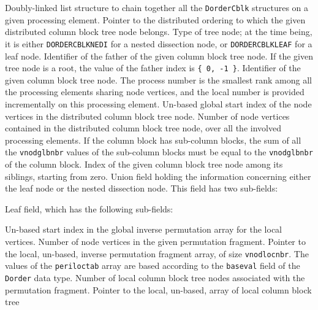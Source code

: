\begin{itemize}
  Doubly-linked list structure to chain together all
  the \texttt{Dorder\lbt Cblk} structures on a given processing
  element.
  Pointer to the distributed ordering to which the given distributed
  column block tree node belongs.
  Type of tree node; at the time being, it is either
  \texttt{DORDER\lbt CBLK\lbt NEDI} for a nested dissection node, or
  \texttt{DORDER\lbt CBLK\lbt LEAF} for a leaf node.
  Identifier of the father of the given column block tree node. If the
  given tree node is a root, the value of the father index is
  \texttt{\{~0, -1~\}}.
  Identifier of the given column block tree node. The process number
  is the smallest rank among all the processing elements sharing node
  vertices, and the local number is provided incrementally on this
  processing element.
  Un-based global start index of the node vertices in the distributed
  column block tree node.
  Number of node vertices contained in the distributed column block
  tree node, over all the involved processing elements. If the
  column block has sub-column blocks, the sum of all the
  \texttt{vnodglbnbr} values of the sub-column blocks must be equal to
  the \texttt{vnodglbnbr} of the column block.
  Index of the given column block tree node among its siblings,
  starting from zero.
  Union field holding the information concerning either the leaf node
  or the nested dissection node. This field has two sub-fields:
  \begin{itemize}
    Leaf field, which has the following sub-fields:
    \begin{itemize}
      Un-based start index in the global inverse permutation array for
      the local vertices.
      Number of node vertices in the given permutation fragment.
      Pointer to the local, un-based, inverse permutation fragment
      array, of size \texttt{vnod\lbt loc\lbt nbr}. The values of the
      \texttt{peri\lbt loc\lbt tab} array are based according to the
      \texttt{baseval} field of the \texttt{Dorder} data type.
      Number of local column block tree nodes associated with the
      permutation fragment.
      Pointer to the local, un-based, array of local column block tree

\end{itemize}
\end{itemize}
\end{itemize}
